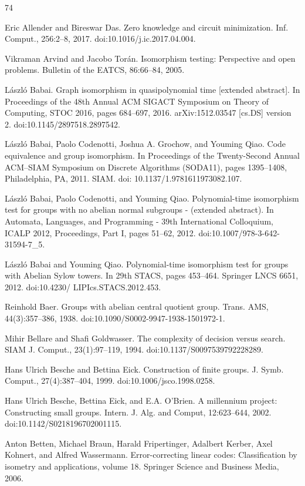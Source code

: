 \documentclass[10pt,a4paper]{article}
\begin{document}
\begin{thebibliography}{74}

Eric Allender and Bireswar Das. Zero knowledge and circuit minimization. Inf. Comput., 256:2–8, 2017. doi:10.1016/j.ic.2017.04.004.

Vikraman Arvind and Jacobo Torán. Isomorphism testing: Perspective and open problems. Bulletin of the EATCS, 86:66–84, 2005.

László Babai. Graph isomorphism in quasipolynomial time [extended abstract]. In Proceedings of the 48th Annual ACM SIGACT Symposium on Theory of Computing, STOC 2016, pages 684–697, 2016. arXiv:1512.03547 [cs.DS] version 2. doi:10.1145/2897518.2897542.

László Babai, Paolo Codenotti, Joshua A. Grochow, and Youming Qiao. Code equivalence and group isomorphism. In Proceedings of the Twenty-Second Annual ACM–SIAM Symposium on Discrete Algorithms (SODA11), pages 1395–1408, Philadelphia, PA, 2011. SIAM. doi: 10.1137/1.9781611973082.107.

László Babai, Paolo Codenotti, and Youming Qiao. Polynomial-time isomorphism test for groups with no abelian normal subgroups - (extended abstract). In Automata, Languages, and Programming - 39th International Colloquium, ICALP 2012, Proceedings, Part I, pages 51–62, 2012. doi:10.1007/978-3-642-31594-7\_5.

László Babai and Youming Qiao. Polynomial-time isomorphism test for groups with Abelian Sylow towers. In 29th STACS, pages 453–464. Springer LNCS 6651, 2012. doi:10.4230/ LIPIcs.STACS.2012.453.

Reinhold Baer. Groups with abelian central quotient group. Trans. AMS, 44(3):357–386, 1938. doi:10.1090/S0002-9947-1938-1501972-1.

Mihir Bellare and Shafi Goldwasser. The complexity of decision versus search. SIAM J. Comput., 23(1):97–119, 1994. doi:10.1137/S0097539792228289.

Hans Ulrich Besche and Bettina Eick. Construction of finite groups. J. Symb. Comput., 27(4):387–404, 1999. doi:10.1006/jsco.1998.0258.

Hans Ulrich Besche, Bettina Eick, and E.A. O’Brien. A millennium project: Constructing small groups. Intern. J. Alg. and Comput, 12:623–644, 2002. doi:10.1142/S0218196702001115.

Anton Betten, Michael Braun, Harald Fripertinger, Adalbert Kerber, Axel Kohnert, and Alfred Wassermann. Error-correcting linear codes: Classification by isometry and applications, volume 18. Springer Science and Business Media, 2006.


\end{thebibliography}
\end{document}
